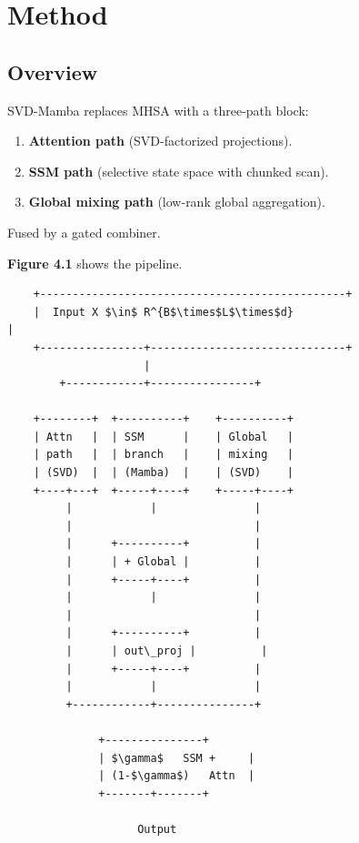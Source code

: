 
\section{Method}

\subsection{Overview}

SVD-Mamba replaces MHSA with a three-path block:

\begin{enumerate}
\item \textbf{Attention path} (SVD-factorized projections).
\item \textbf{SSM path} (selective state space with chunked scan).
\item \textbf{Global mixing path} (low-rank global aggregation).

\end{enumerate}
Fused by a gated combiner.

\textbf{Figure 4.1} shows the pipeline.

\begin{lstlisting}
    +-----------------------------------------------+
    |  Input X $\in$ R^{B$\times$L$\times$d}                          |
    +----------------+------------------------------+
                     |
        +------------+----------------+
                                       
    +--------+  +----------+    +----------+
    | Attn   |  | SSM      |    | Global   |
    | path   |  | branch   |    | mixing   |
    | (SVD)  |  | (Mamba)  |    | (SVD)    |
    +----+---+  +-----+----+    +-----+----+
         |            |               |
         |                            |
         |      +----------+          |
         |      | + Global |          |
         |      +-----+----+          |
         |            |               |
         |                            |
         |      +----------+          |
         |      | out\_proj |          |
         |      +-----+----+          |
         |            |               |
         +------------+---------------+
                       
              +---------------+
              | $\gamma$   SSM +     |
              | (1-$\gamma$)   Attn  |
              +-------+-------+
                       
                    Output
\end{lstlisting}

